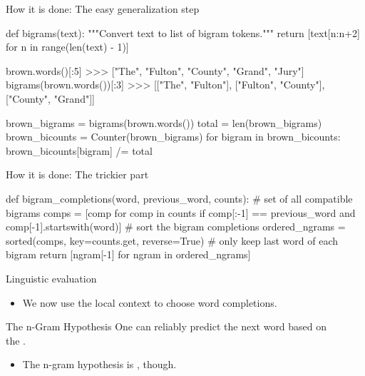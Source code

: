 \documentclass[professionalfonts, xcolor={usenames,svgnames,x11names,table}]{beamer}
\begin{document}
\begin{frame}[fragile]{How it is done: The easy generalization step}
    \begin{pythoncode}
        def bigrams(text):
            """Convert text to list of bigram tokens."""
            return [text[n:n+2] for n in range(len(text) - 1)]

        
        brown.words()[:5]
        >>> ["The", "Fulton", "County", "Grand", "Jury"]
        bigrams(brown.words())[:3]
        >>> [["The", "Fulton"], ["Fulton", "County"],
             ["County", "Grand"]]
    \end{pythoncode}

    \begin{pythoncode}
        brown_bigrams = bigrams(brown.words())
        total = len(brown_bigrams)
        brown_bicounts = Counter(brown_bigrams)
        for bigram in brown_bicounts:
            brown_bicounts[bigram] /= total
    \end{pythoncode}
\end{frame}

\begin{frame}[fragile]{How it is done: The trickier part}
    \begin{pythoncode}
def bigram_completions(word, previous_word, counts):
    # set of all compatible bigrams
    comps = [comp for comp in counts
             if comp[:-1] == previous_word and
                comp[-1].startswith(word)]
    # sort the bigram completions
    ordered_ngrams = sorted(comps,
                            key=counts.get,
                            reverse=True)
    # only keep last word of each bigram
    return [ngram[-1] for ngram in ordered_ngrams]
    \end{pythoncode}
\end{frame}

\begin{frame}{Linguistic evaluation}
    \begin{itemize}
        \item We now use the local context to choose word completions.
    \end{itemize}

    \begin{block}{The n-Gram Hypothesis}
        One can reliably predict the next word based on\\
        the .
    \end{block}

    \begin{itemize}
        \item The n-gram hypothesis is , though.
    \end{itemize}
\end{frame}
\end{document}

